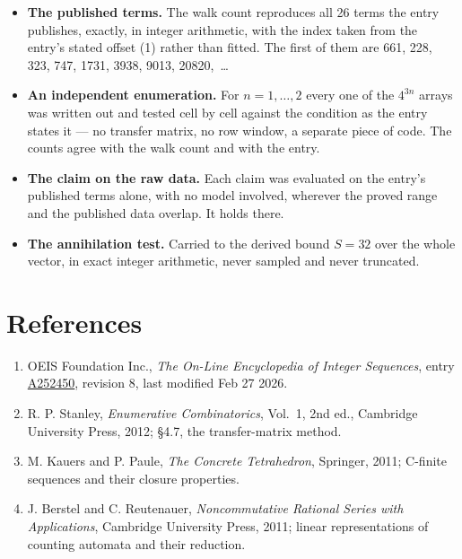 \documentclass[11pt]{article}
\theoremstyle{definition}
\begin{document}
\begin{itemize}

\item {\bfseries The published terms.} The walk count reproduces all 26 terms the entry publishes, exactly, in integer arithmetic, with the index taken from the entry's stated offset (1) rather than fitted. The first of them are 661, 228, 323, 747, 1731, 3938, 9013, 20820,~\dots

\item {\bfseries An independent enumeration.} For $n = 1,\dots,2$ every one of the $4^{3n}$ arrays was written out and tested cell by cell against the condition as the entry states it --- no transfer matrix, no row window, a separate piece of code. The counts agree with the walk count and with the entry.

\item {\bfseries The claim on the raw data.} Each claim was evaluated on the entry's published terms alone, with no model involved, wherever the proved range and the published data overlap. It holds there.

\item {\bfseries The annihilation test.} Carried to the derived bound $S = 32$ over the whole vector, in exact integer arithmetic, never sampled and never truncated.

\end{itemize}

\section{References}

\begin{enumerate}

\item OEIS Foundation Inc., \emph{The On-Line Encyclopedia of Integer Sequences}, entry \href{https://oeis.org/A252450}{A252450}, revision 8, last modified Feb 27 2026.

\item R. P. Stanley, \emph{Enumerative Combinatorics}, Vol.~1, 2nd ed., Cambridge University Press, 2012; \S4.7, the transfer-matrix method.

\item M. Kauers and P. Paule, \emph{The Concrete Tetrahedron}, Springer, 2011; C-finite sequences and their closure properties.

\item J. Berstel and C. Reutenauer, \emph{Noncommutative Rational Series with Applications}, Cambridge University Press, 2011; linear representations of counting automata and their reduction.

\end{enumerate}
\end{document}
